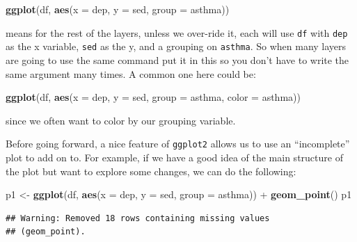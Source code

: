 \documentclass[]{tufte-book}
\newenvironment{Shaded}{}{}
\newcommand{\KeywordTok}[1]{\textcolor[rgb]{0.00,0.44,0.13}{\textbf{#1}}}
\newcommand{\DataTypeTok}[1]{\textcolor[rgb]{0.56,0.13,0.00}{#1}}
\newcommand{\StringTok}[1]{\textcolor[rgb]{0.25,0.44,0.63}{#1}}
\newcommand{\OperatorTok}[1]{\textcolor[rgb]{0.40,0.40,0.40}{#1}}
\newcommand{\NormalTok}[1]{#1}
\theoremstyle{definition}
\theoremstyle{definition}
\theoremstyle{remark}
\begin{document}
\begin{Shaded}
\begin{Highlighting}[]
\KeywordTok{ggplot}\NormalTok{(df, }\KeywordTok{aes}\NormalTok{(}\DataTypeTok{x =}\NormalTok{ dep, }\DataTypeTok{y =}\NormalTok{ sed, }\DataTypeTok{group =}\NormalTok{ asthma))}
\end{Highlighting}
\end{Shaded}

means for the rest of the layers, unless we over-ride it, each will use
\texttt{df} with \texttt{dep} as the x variable, \texttt{sed} as the y,
and a grouping on \texttt{asthma}. So when many layers are going to use
the same command put it in this so you don't have to write the same
argument many times. A common one here could be:

\begin{Shaded}
\begin{Highlighting}[]
\KeywordTok{ggplot}\NormalTok{(df, }\KeywordTok{aes}\NormalTok{(}\DataTypeTok{x =}\NormalTok{ dep, }\DataTypeTok{y =}\NormalTok{ sed, }\DataTypeTok{group =}\NormalTok{ asthma, }
    \DataTypeTok{color =}\NormalTok{ asthma))}
\end{Highlighting}
\end{Shaded}

since we often want to color by our grouping variable.

Before going forward, a nice feature of \texttt{ggplot2} allows us to
use an ``incomplete'' plot to add on to. For example, if we have a good
idea of the main structure of the plot but want to explore some changes,
we can do the following:

\begin{Shaded}
\begin{Highlighting}[]
\NormalTok{p1 <-}\StringTok{ }\KeywordTok{ggplot}\NormalTok{(df, }\KeywordTok{aes}\NormalTok{(}\DataTypeTok{x =}\NormalTok{ dep, }\DataTypeTok{y =}\NormalTok{ sed, }\DataTypeTok{group =}\NormalTok{ asthma)) }\OperatorTok{+}\StringTok{ }
\StringTok{    }\KeywordTok{geom_point}\NormalTok{()}
\NormalTok{p1}
\end{Highlighting}
\end{Shaded}

\begin{verbatim}
## Warning: Removed 18 rows containing missing values
## (geom_point).
\end{verbatim}
\end{document}

